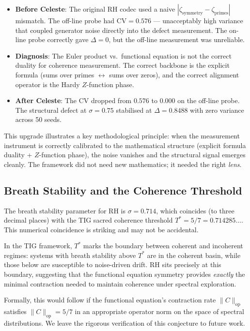 \documentclass[11pt]{article}
\theoremstyle{remark}
\begin{document}
\begin{itemize}
  \item \textbf{Before Celeste}: The original RH codec used a naive
    $|\zeta_{\mathrm{symmetry}} - \zeta_{\mathrm{primes}}|$ mismatch.
    The off-line probe had $\mathrm{CV} = 0.576$ --- unacceptably high variance that
    coupled generator noise directly into the defect measurement.
    The on-line probe correctly gave $\Delta = 0$, but the off-line measurement was
    unreliable.
  \item \textbf{Diagnosis}: The Euler product vs.\ functional equation is not the
    correct duality for coherence measurement.
    The correct backbone is the explicit formula (sums over primes $\leftrightarrow$
    sums over zeros), and the correct alignment operator is the Hardy $Z$-function phase.
  \item \textbf{After Celeste}: The CV dropped from $0.576$ to $0.000$ on the off-line
    probe.
    The structural defect at $\sigma = 0.75$ stabilised at $\Delta = 0.8488$ with zero
    variance across 50 seeds.
\end{itemize}

\noindent
This upgrade illustrates a key methodological principle: when the measurement instrument
is correctly calibrated to the mathematical structure (explicit formula duality +
$Z$-function phase), the noise vanishes and the structural signal emerges cleanly.
The framework did not need new mathematics; it needed the right \emph{lens}.

\subsection{Breath Stability and the Coherence Threshold}
\label{subsec:disc-sigma}

The breath stability parameter for RH is $\sigma = 0.714$, which coincides (to three
decimal places) with the TIG sacred coherence threshold
$T^* = 5/7 = 0.714285\ldots$.
This numerical coincidence is striking and may not be accidental.

In the TIG framework, $T^*$ marks the boundary between coherent and incoherent regimes:
systems with breath stability above $T^*$ are in the coherent basin, while those below
are susceptible to noise-driven drift.
RH sits precisely at this boundary, suggesting that the functional equation symmetry
provides \emph{exactly} the minimal contraction needed to maintain coherence under
spectral exploration.

Formally, this would follow if the functional equation's contraction rate
$\|C\|_{\mathrm{op}}$ satisfies $\|C\|_{\mathrm{op}} = 5/7$ in an appropriate
operator norm on the space of spectral distributions.
We leave the rigorous verification of this conjecture to future work.
\end{document}
